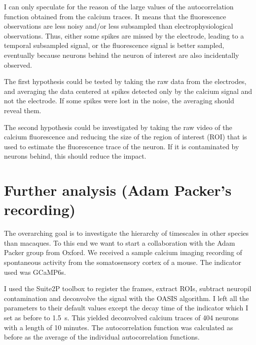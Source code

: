 \documentclass[12pt,a4paper,headinclude]{scrartcl}
\begin{document}
I can only speculate for the reason of the large values of the autocorrelation function obtained from the calcium traces. It means that the fluorescence observations are less noisy and/or less subsampled than electrophysiological observations. Thus, either some spikes are missed by the electrode, leading to a temporal subsampled signal, or the fluorescence signal is better sampled, eventually because neurons behind the neuron of interest are also incidentally observed. 

The first hypothesis could be tested by taking the raw data from the electrodes, and averaging the data centered at spikes detected only by the calcium signal and not the electrode. If some spikes were lost in the noise, the averaging should reveal them.

The second hypothesis could be investigated by taking the raw video of the calcium fluorescence and reducing the size of the region of interest (ROI) that is used to estimate the fluorescence trace of the neuron. If it is contaminated by neurons behind, this should reduce the impact.

\section{Further analysis (Adam Packer's recording)}

The overarching goal is to investigate the hierarchy of timescales in other species than macaques. To this end
we want to start a collaboration with the Adam Packer group from Oxford. We received a sample calcium imaging recording of spontaneous activity from the somatosensory cortex of a mouse. The indicator used was GCaMP6s. 

I used the Suite2P toolbox \cite{pachitariu_suite2p:_2017} to register the frames, extract ROIs, subtract neuropil contamination and deconvolve the signal with the OASIS algorithm. I left all the parameters to their default values except the decay time of the indicator which I set as before to \SI{1.5}{s}. This yielded deconvolved calcium traces of 404 neurons with a length of 10 minutes. The autocorrelation function was calculated as before as the average of the individual autocorrelation functions.
\end{document}
